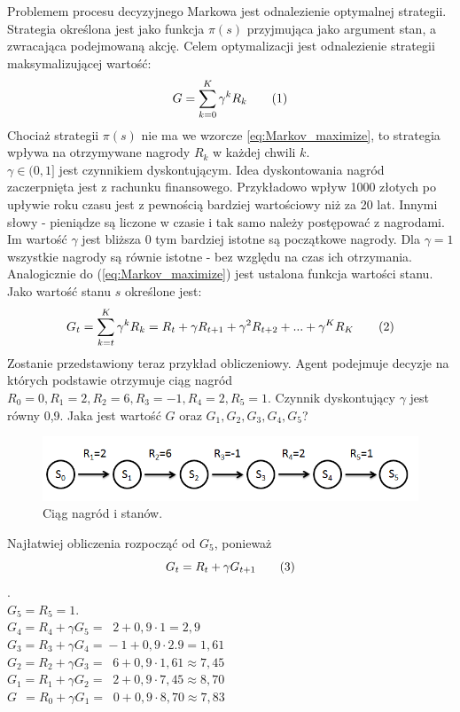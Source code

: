 \documentclass[12pt]{book}
\theoremstyle{plain}
\newcommand\addtag{\refstepcounter{equation}
\renewcommand{\labelenumii}{\theenumii}
\renewcommand{\theenumii}{\theenumi.\arabic{enumii}.}
\tag{\theequation}}
\begin{document}
Problemem procesu decyzyjnego Markowa jest odnalezienie optymalnej strategii. Strategia określona jest jako funkcja $\pi(s)$ przyjmująca jako argument stan, a zwracająca podejmowaną akcję. Celem optymalizacji jest odnalezienie strategii maksymalizującej wartość:
\[
G=\sum_{k=0}^{K} \gamma^k R_{k} \addtag \label{eq:Markov_maximize}
\]
Chociaż strategii $\pi(s)$ nie ma we wzorcze \ref{eq:Markov_maximize}, to strategia wpływa na otrzymywane nagrody $R_{k}$ w każdej chwili $k$.\\
$\gamma \in (0,1]$ jest czynnikiem dyskontującym. Idea dyskontowania nagród zaczerpnięta jest z rachunku finansowego. Przykładowo wpływ 1000 złotych po upływie roku czasu jest z pewnością bardziej wartościowy niż za 20 lat. Innymi słowy - pieniądze są liczone w czasie i tak samo należy postępować z nagrodami. Im wartość $\gamma$ jest bliższa 0 tym bardziej istotne są początkowe nagrody. Dla $\gamma=1$ wszystkie nagrody są równie istotne - bez względu na czas ich otrzymania.\\
Analogicznie do (\ref{eq:Markov_maximize}) jest ustalona funkcja wartości stanu. Jako wartość stanu $s$ określone jest:
\[
G_t=\sum_{k=t}^{K} \gamma^k R_{k}=R_{t}+\gamma R_{t+1}+\gamma^{2} R_{t+2}+...+\gamma^{K}R_K \addtag \label{eq:Markov_state_value_G}
\]
Zostanie przedstawiony teraz przykład obliczeniowy. Agent podejmuje decyzje na których podstawie otrzymuje ciąg  nagród $R_0=0, R_1=2,R_2=6,R_3=-1,R_4=2,R_5=1$. Czynnik dyskontujący $\gamma$ jest równy 0,9. Jaka jest wartość $G$ oraz $G_1,G_2,G_3,G_4,G_5$?\\
\begin{figure}[H]
  \centering
    \includegraphics[width=14cm]{rewards-graph}
 \caption{Ciąg nagród i stanów.}
 \label{fig:agent-srodowisko}
\end{figure}\noindent
Najłatwiej obliczenia rozpocząć od $G_5$, ponieważ
\[G_{t}=R_{t}+\gamma G_{t+1} \label{eq:G_reccurential} \addtag \].\\
$G_5=R_5=1$.\\
$G_4=R_4+\gamma G_{5}=\;\;2+0,9\cdot 1=2,9$\\
$G_3=R_3+\gamma G_{4}=\!-1+0,9\cdot2.9=1,61$\\
$G_2=R_2+\gamma G_{3}=\;\;6+0,9\cdot1,61 \approx 7,45$\\
$G_1=R_1+\gamma G_{2}=\;\;2+0,9\cdot 7,45 \approx 8,70$\\
$G\;\,=R_0+\gamma G_{1}=\;\;0+0,9\cdot 8,70 \approx 7,83$\\
\end{document}
